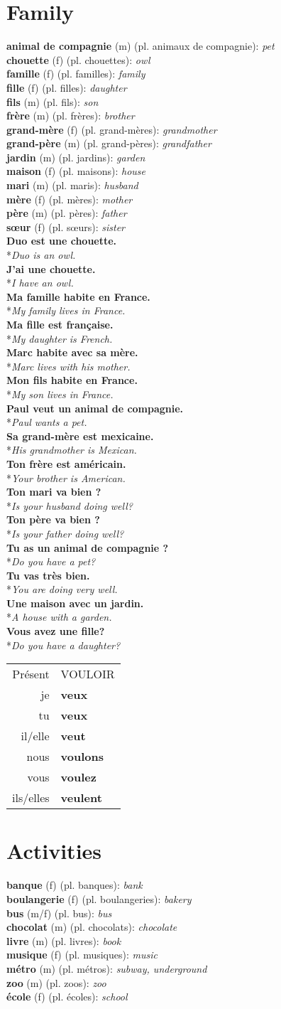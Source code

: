 \documentclass[a4paper,11pt,oneside]{book}
\newcommand{\phrase}[2]{\noindent\textbf{#1}\\*\-\hspace{0.5cm}\textit{#2}\\}
\newcommand{\verbconj}[8]{
\begin{tabular}{rl}
#1 & \MakeUppercase{#2} \\ 
je & \textbf{#3} \\  
tu & \textbf{#4} \\
il/elle & \textbf{#5} \\  
nous & \textbf{#6} \\  
vous & \textbf{#7} \\  
ils/elles & \textbf{#8}  
\end{tabular}
}
\newcommand{\noundef}[4]{\textbf{#1} (#3) (pl. #2): \textit{#4}\\}
\begin{document}
\section{Family}

\noundef{animal de compagnie}{animaux de compagnie}{m}{pet}
\noundef{chouette}{chouettes}{f}{owl}
\noundef{famille}{familles}{f}{family}
\noundef{fille}{filles}{f}{daughter}
\noundef{fils}{fils}{m}{son}
\noundef{frère}{frères}{m}{brother}
\noundef{grand-mère}{grand-mères}{f}{grandmother}
\noundef{grand-père}{grand-pères}{m}{grandfather}
\noundef{jardin}{jardins}{m}{garden}
\noundef{maison}{maisons}{f}{house}
\noundef{mari}{maris}{m}{husband}
\noundef{mère}{mères}{f}{mother}
\noundef{père}{pères}{m}{father}
\noundef{sœur}{sœurs}{f}{sister}

\phrase{Duo est une chouette.}{Duo is an owl.}
\phrase{J'ai une chouette.}{I have an owl.}
\phrase{Ma famille habite en France.}{My family lives in France.}
\phrase{Ma fille est française.}{My daughter is French.}
\phrase{Marc habite avec sa mère.}{Marc lives with his mother.}
\phrase{Mon fils habite en France.}{My son lives in France.}
\phrase{Paul veut un animal de compagnie.}{Paul wants a pet.}
\phrase{Sa grand-mère est mexicaine.}{His grandmother is Mexican.}
\phrase{Ton frère est américain.}{Your brother is American.}
\phrase{Ton mari va bien ?}{Is your husband doing well?}
\phrase{Ton père va bien ?}{Is your father doing well?}
\phrase{Tu as un animal de compagnie ?}{Do you have a pet?}
\phrase{Tu vas très bien.}{You are doing very well.}
\phrase{Une maison avec un jardin.}{A house with a garden.}
\phrase{Vous avez une fille?}{Do you have a daughter?}

\begin{center}
\verbconj{Présent}{vouloir}{veux}{veux}{veut}{voulons}{voulez}{veulent}
\end{center}

\section{Activities}

\noundef{banque}{banques}{f}{bank}
\noundef{boulangerie}{boulangeries}{f}{bakery}
\noundef{bus}{bus}{m/f}{bus}
\noundef{chocolat}{chocolats}{m}{chocolate}
\noundef{livre}{livres}{m}{book}
\noundef{musique}{musiques}{f}{music}
\noundef{métro}{métros}{m}{subway, underground}
\noundef{zoo}{zoos}{m}{zoo}
\noundef{école}{écoles}{f}{school}
\end{document}
